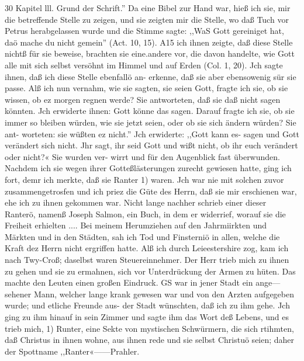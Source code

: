 
30 Kapitel lll.
Grund der Schrift.'' Da eine Bibel zur Hand war, hieß ich sie,
mir die betreffende Stelle zu zeigen, und sie zeigten mir die Stelle,
wo daß Tuch vor Petrus herabgelassen wurde und die Stimme
sagte: ,,WaS Gott gereiniget hat, daö mache du nicht gemein''
(Act. 10, 15). A15 ich ihnen zeigte, daß diese Stelle nichtß für
sie beweise, brachten sie eine.andere vor, die davon handelte, wie
Gott alle mit sich selbst versöhnt im Himmel und auf Erden
(Col. 1, 20). Jch sagte ihnen, daß ich diese Stelle ebenfallö an-
erkenne, daß sie aber ebensowenig sür sie passe. Alß ich nun
vernahm, wie sie sagten, sie seien Gott, fragte ich sie, ob sie
wissen, ob ez morgen regnen werde? Sie antworteten, daß sie
daß nicht sagen könnten. Jch erwiderte ihnen: Gott könne das
sagen. Darauf fragte ich sie, ob sie immer so bleiben würden,
wie sie jetzt seien, oder ob sie sich ändern würden? Sie ant-
worteten: sie wüßten ez nicht.'' Jch erwiderte: ,,Gott kann es-
sagen und Gott verändert sich nicht. Jhr sagt, ihr seid Gott und
wißt nicht, ob ihr euch verändert oder nicht?« Sie wurden ver-
wirrt und für den Augenblick fast überwunden. Nachdem ich sie
wegen ihrer Gotteßlästerungen zurecht gewiesen hatte, ging ich
fort, demr ich merkte, daß sie Ranter 1) waren. Jch war nie
mit solchen zuvor zusammengetrosfen und ich priez die Güte des
Herrn, daß sie mir erschienen war, ehe ich zu ihnen gekommen
war. Nicht lange nachher schrieb einer dieser Ranterö, namenß
Joseph Salmon, ein Buch, in dem er widerrief, worauf sie die
Freiheit erhielten ....
Bei meinem Herumziehen auf den Jahrmiirkten und Märkten
und in den Städten, sah ich Tod und Finsterniö in allen, welche
die Kraft dez Herrn nicht ergriffen hatte. Alß ich durch Leieestershire
zog, kam ich nach Twy-Croß; daselbst waren Steuereinnehmer.
Der Herr trieb mich zu ihnen zu gehen und sie zu ermahnen,
sich vor Unterdrückung der Armen zu hüten. Das machte den
Leuten einen großen Eindruck. GS war in jener Stadt ein ange—
sehener Mann, welcher lange krank gewesen war und von den
Arzten aufgegeben wurde; und etliche Freunde aus- der Stadt
wünschten, daß ich zu ihm gehe. Jch ging zu ihm hinauf in sein
Zimmer und sagte ihm das Wort deß Lebens, und es trieb mich,
1) Runter, eine Sekte von mystischen Schwürmern, die sich rtihmten,
daß Christus in ihnen wohne, aus ihnen rede und sie selbst Christuö seien;
daher der Spottname ,,Ranter«——Prahler.


